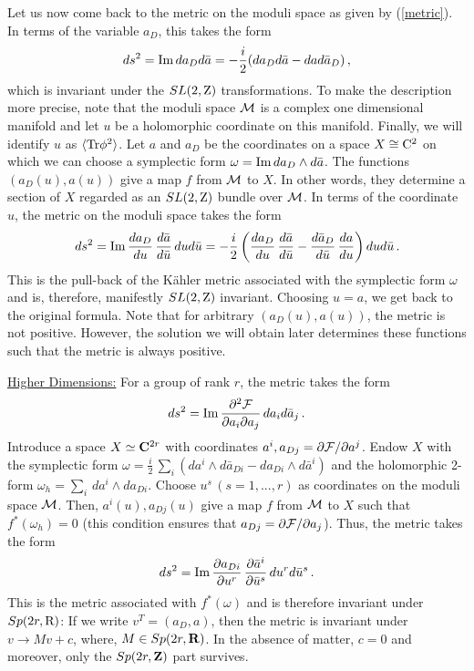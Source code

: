 Let us now come back to the metric on the moduli space as given by 
(\ref{metric}). In terms of the variable $a_D$, this takes the form
$$
ds^2={\rm Im}\,da_D d\bar{a}=-\frac{i}{2}(da_D d\bar{a}-da d\bar{a}_D)\,,
$$
which is invariant under the $SL(2,{\rm Z})$ transformations. To make
the description more precise, note that the moduli space ${\cal M}$ is
a complex one dimensional manifold and let $u$ be a holomorphic
coordinate on this manifold. Finally, we will identify $u$ as 
$\langle{\rm Tr}\phi^2\rangle$. Let $a$ and $a_D$ be the coordinates
on a space $X \cong {\rm C}^2$ on which we can choose a symplectic form
$\omega={\rm Im}\,da_D\wedge d\bar{a}$. The functions
$(a_{D}(u),a(u))$ give a map $f$ from ${\cal M}$ to $X$. In other
words, they determine a section of $X$ regarded as an $SL(2,{\rm Z})$
bundle over ${\cal M}$. In terms of the coordinate $u$, the metric on
the moduli space takes the form 
$$
ds^2 ={\rm Im}\,\frac{da_D}{du}\,\frac{d \bar{a}}{d\bar{u}}\,
dud\bar{u}=-\frac{i}{2}\left(\frac{da_{D}}{du}\,\frac{d\bar{a}}{d\bar{u}}
-\frac{d\bar{a}_D}{d\bar{u}}\,\frac{da}{du}\right)dud\bar{u}\,.
$$
This is the pull-back of the K\"{a}hler metric associated with the
symplectic form $\omega$ and is, therefore, manifestly $SL(2,{\rm Z})$
invariant. Choosing $u=a$, we get back to the original formula. Note
that for arbitrary $(a_D(u),a(u))$, the metric is not
positive. However, the solution we will obtain later determines these
functions such that the metric is always positive.  

\noindent\underline{Higher Dimensions:}
{}For a group of rank $r$, the metric takes the form
$$
ds^2 ={\rm Im}\,\frac{\partial^2{\cal F}}{\partial a_i\partial a_j}\, 
da_i d\bar{a}_j\,.
$$
Introduce a space $X \simeq {\bf C}^{2r}$ with coordinates $a^{i},
a_{Dj}=\partial {\cal F}/\partial a^{j}$. Endow $X$ with the symplectic
form $\omega=\frac{i}{2}\,\sum_{i}(da^i\wedge d\bar{a}_{Di}-da_{Di} 
\wedge d\bar{a}^i)$ and the holomorphic 2-form $\omega_h =\sum_{i} \, 
da^{i} \wedge da_{Di}$. Choose $u^s\, (s=1,...,r)$ as coordinates on
the moduli space ${\cal M}$. Then, $a^i(u),a_{Dj}(u)$ give a map $f$
from ${\cal M}$ to $X$ such that $f^{*}(\omega_{h}) = 0$ (this
condition ensures that $a_{Dj}=\partial {\cal F}/\partial a_{j}$). 
Thus, the metric takes the form 
$$
ds^{2} = {\rm Im} \, \frac{\partial a_{Di}}{\partial u^{r}} \,
\frac{\partial \bar{a}^{i}}{\partial \bar{u}^{s}} \,
du^{r} d\bar{u}^{s}\,.
$$
This is the metric associated with $f^*(\omega)$ and is therefore
invariant under $Sp(2r,{\rm R})$: If we write $v^T =(a_D, a )$, then
the metric is invariant under $v\rightarrow Mv + c$, where, $M \in
Sp(2r,{\bf R})$. In the absence of matter, $c=0$ and moreover, only
the $Sp(2r,{\bf Z})$ part survives.

